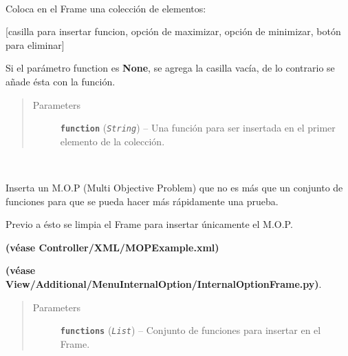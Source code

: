 \documentclass[letterpaper,10pt,english]{sphinxmanual}
\begin{document}
\begin{fulllineitems}
\begin{fulllineitems}
\label{View/Main/ObjectiveFunction/FunctionFrame:View.Main.ObjectiveFunction.FunctionFrame.FunctionFrame.insert_function}~
\begin{DUlineblock}{0em}
\item[] Coloca en el Frame una colección de elementos:
\item[] {[}casilla para insertar funcion, opción de maximizar, opción de minimizar, botón para eliminar{]}
\item[] Si el parámetro function es \textbf{None}, se agrega la casilla vacía, de lo contrario se 
añade ésta con la función.
\end{DUlineblock}
\begin{quote}\begin{description}
\item[{Parameters}] \leavevmode
\textbf{\texttt{function}} (\emph{\texttt{String}}) -- Una función para ser insertada en el primer elemento de la colección.

\end{description}\end{quote}

\end{fulllineitems}


\begin{fulllineitems}
\label{View/Main/ObjectiveFunction/FunctionFrame:View.Main.ObjectiveFunction.FunctionFrame.FunctionFrame.insert_mop_example}~
\begin{DUlineblock}{0em}
\item[] Inserta un M.O.P (Multi Objective Problem) que no es más que un conjunto de 
funciones para que se pueda hacer más rápidamente una prueba.
\item[] Previo a ésto se limpia el Frame para insertar únicamente el M.O.P.
\item[] \textbf{(véase Controller/XML/MOPExample.xml)}
\item[] \textbf{(véase View/Additional/MenuInternalOption/InternalOptionFrame.py)}.
\end{DUlineblock}
\begin{quote}\begin{description}
\item[{Parameters}] \leavevmode
\textbf{\texttt{functions}} (\emph{\texttt{List}}) -- Conjunto de funciones para insertar en el Frame.


\end{description}
\end{quote}
\end{fulllineitems}
\end{fulllineitems}
\end{document}
